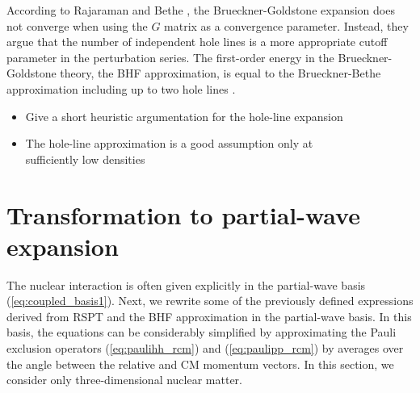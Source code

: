 \documentclass[a4paper,12pt]{report}
\begin{document}
According to Rajaraman and Bethe \cite{raja}, the Brueckner-Goldstone 
expansion does not converge when using the $G$ matrix as a convergence 
parameter. Instead, they argue that the number of independent hole lines 
is a more appropriate cutoff parameter in the perturbation series. The 
first-order energy in the Brueckner-Goldstone theory, the BHF approximation,
 is equal to the Brueckner-Bethe approximation including up to two hole 
lines \cite{day1978}.

\begin{itemize}
\item Give a short heuristic argumentation for the hole-line expansion
\item The hole-line approximation is a good assumption only at \\
  sufficiently low densities
\end{itemize}





\section{Transformation to partial-wave expansion}
The nuclear interaction is often given explicitly in the partial-wave basis
(\ref{eq:coupled_basis1}). Next, we rewrite some of the previously defined 
expressions derived from RSPT and the BHF approximation in the partial-wave 
basis. In this basis, the equations can be considerably simplified by 
approximating the
Pauli exclusion operators (\ref{eq:paulihh_rcm}) and 
(\ref{eq:paulipp_rcm}) by averages over the angle between the relative
and CM momentum vectors. In this section, we consider only 
three-dimensional nuclear matter.
\end{document}
